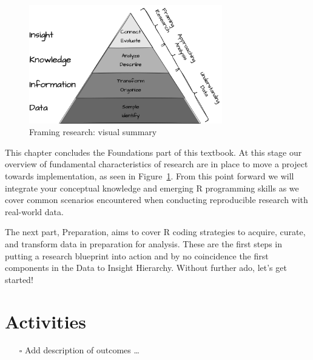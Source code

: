 \documentclass[
  letterpaper,
  DIV=11,
  numbers=noendperiod]{scrreport}
\providecommand{\tightlist}{%
  \setlength{\itemsep}{0pt}\setlength{\parskip}{0pt}}\usepackage{longtable,booktabs,array}
\theoremstyle{definition}
\theoremstyle{remark}
\begin{document}
\begin{figure}[H]

{\centering \includegraphics[width=0.75\textwidth,height=\textheight]{figures/fr-diki.drawio.png}

}

\caption{\label{fig-fr-visual-summary}Framing research: visual summary}

\end{figure}

This chapter concludes the Foundations part of this textbook. At this
stage our overview of fundamental characteristics of research are in
place to move a project towards implementation, as seen in
Figure~\ref{fig-fr-visual-summary}. From this point forward we will
integrate your conceptual knowledge and emerging R programming skills as
we cover common scenarios encountered when conducting reproducible
research with real-world data.

The next part, Preparation, aims to cover R coding strategies to
acquire, curate, and transform data in preparation for analysis. These
are the first steps in putting a research blueprint into action and by
no coincidence the first components in the Data to Insight Hierarchy.
Without further ado, let's get started!

\hypertarget{activities-2}{%
\section*{Activities}\label{activities-2}}


\begin{itemize}
\tightlist
\item[$\square$]
   Add description of outcomes \ldots{}
\end{itemize}
\end{document}
